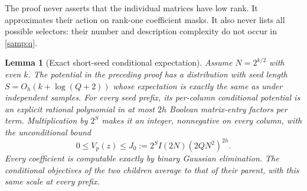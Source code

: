 \documentclass[11pt,letterpaper]{article}
\newtheorem{lemma}[theorem]{Lemma}
\theoremstyle{definition}
\theoremstyle{remark}
\begin{document}
The proof never asserts that the individual matrices have low rank.
It approximates their action on rank-one coefficient masks. It also
never lists all possible selectors: their number and description
complexity do not occur in \cref{samp:q}.

\begin{lemma}[Exact short-seed conditional expectation]
\label{samp:seed}
Assume $N=2^{k/2}$ with even $k$. The potential in the preceding proof
has a distribution with seed length
$S=O_h(k+\log(Q+2))$ whose expectation is exactly the same as under
independent samples. For every seed prefix, its per-column conditional
potential is an explicit rational polynomial in at most $2h$ Boolean
matrix-entry factors per term. Multiplication by $2^S$ makes it an
integer, nonnegative on every column, with the unconditional bound
\begin{equation}
0\le V_p(z)\le
J_0:=2^S I(2N)(2QN^2)^{2h}.
\label{samp:range}
\end{equation}
Every coefficient is computable exactly by binary Gaussian elimination.
The conditional objectives of the two children average to that of
their parent, with this same scale at every prefix.
\end{lemma}
\end{document}
